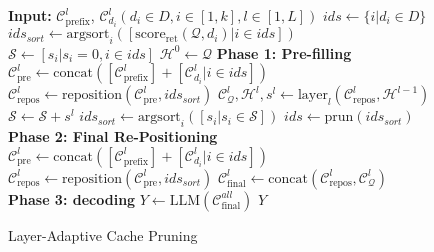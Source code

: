 \begin{figure}[!t]
    \centering
    \small
    \begin{algorithm}[H]
        \caption{Layer-Adaptive Cache Pruning}
        \begin{algorithmic}[1]
            \State \textbf{Input:} $\mathcal{C}_{\text{prefix}}^l$,
            \State $\mathcal{C}_{d_i}^l (d_i \in D, i \in [1, k], l \in [1, L])$
            \State $ids \gets \{i| d_i \in D\}$
            \State $ids_{sort} \gets \text{argsort}_i([\text{score}_{\text{ret}}(\mathcal{Q}, d_i)| i \in ids])$
            \State $\mathcal{S} \gets [s_i| s_i=0, i \in ids]$
            \State $\mathcal{H}^0 \gets \mathcal{Q}$
            \State \textbf{Phase 1: Pre-filling}
                \State $\mathcal{C}_{\text{pre}}^l \gets \text{concat}([\mathcal{C}_{\text{prefix}}^l]+[\mathcal{C}_{d_i}^l| i \in ids])$
                \State $\mathcal{C}_{\text{repos}}^l \gets \text{reposition}(\mathcal{C}_{\text{pre}}^l, ids_{sort})$
                \State $\mathcal{C}_{\mathcal{Q}}^l, \mathcal{H}^l, s^l \gets \text{layer}_l(\mathcal{C}_{\text{repos}}^l, \mathcal{H}^{l-1})$
                \State $\mathcal{S} \gets \mathcal{S} + s^l$
                    \State $ids_{sort} \gets \text{argsort}_i([s_i|s_i \in \mathcal{S}])$
                    \State $ids \gets \text{prun}(ids_{sort})$
                \EndIf
            \EndFor
            \State \textbf{Phase 2: Final Re-Positioning}
                \State $\mathcal{C}_{\text{pre}}^l \gets \text{concat}([\mathcal{C}_{\text{prefix}}^l]+[\mathcal{C}_{d_i}^l| i \in ids])$
                \State $\mathcal{C}_{\text{repos}}^l \gets \text{reposition}(\mathcal{C}_{\text{pre}}^l, ids_{sort})$
                \State $\mathcal{C}_{\text{final}}^l \gets \text{concat}(\mathcal{C}_{\text{repos}}^l, \mathcal{C}_\mathcal{Q}^l)$
            \EndFor
            \State \textbf{Phase 3: decoding}
            \State $Y \gets \text{LLM}(\mathcal{C}_{\text{final}}^{all})$
            \State \Return $Y$
        \end{algorithmic}
    \end{algorithm}
    \hfill
    \vspace{-2em}
    \addtocounter{algorithm}{-1}
    \label{alg:method:LayerAdaptiveCachePruning}
\end{figure}